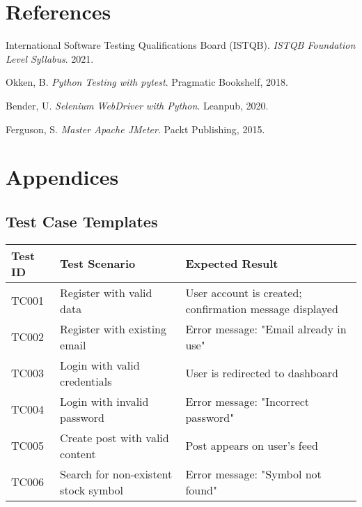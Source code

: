 \documentclass[12pt,a4paper]{report}
\begin{document}
\chapter{References}
\begin{thebibliography}{9}
International Software Testing Qualifications Board (ISTQB). \textit{ISTQB Foundation Level Syllabus}. 2021.

Okken, B. \textit{Python Testing with pytest}. Pragmatic Bookshelf, 2018.

Bender, U. \textit{Selenium WebDriver with Python}. Leanpub, 2020.

Ferguson, S. \textit{Master Apache JMeter}. Packt Publishing, 2015.

\end{thebibliography}

\appendix
\chapter{Appendices}
\section{Test Case Templates}
\begin{longtable}{p{2cm} p{4cm} p{8cm}}
\toprule
\textbf{Test ID} & \textbf{Test Scenario} & \textbf{Expected Result} \\
\midrule
TC001 & Register with valid data & User account is created; confirmation message displayed \\
TC002 & Register with existing email & Error message: "Email already in use" \\
TC003 & Login with valid credentials & User is redirected to dashboard \\
TC004 & Login with invalid password & Error message: "Incorrect password" \\
TC005 & Create post with valid content & Post appears on user's feed \\
TC006 & Search for non-existent stock symbol & Error message: "Symbol not found" \\
\bottomrule
\end{longtable}
\end{document}
